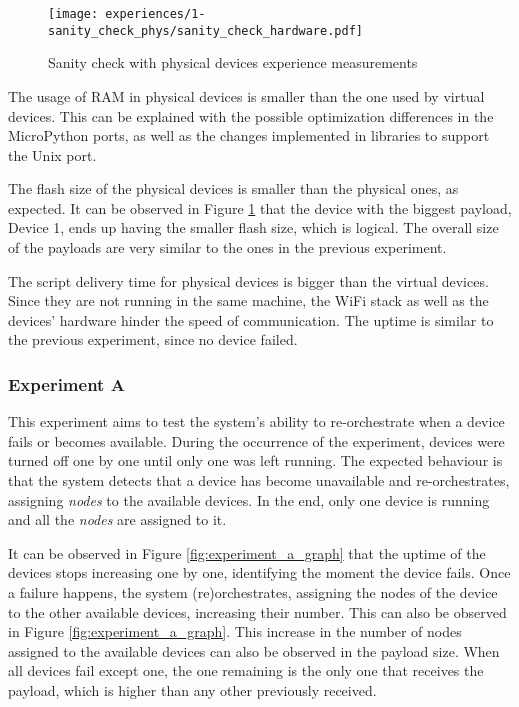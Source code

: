 \begin{figure}[h]
\centering
\texttt{[image: experiences/1-sanity\_check\_phys/sanity\_check\_hardware.pdf]}
\caption[Sanity check with physical devices experience measurements]{Sanity check with physical devices experience measurements}\label{fig:sanity_check_phys_graph}
\end{figure}

The usage of RAM in physical devices is smaller than the one used by virtual devices. This can be explained with the possible optimization differences in the MicroPython ports, as well as the changes implemented in libraries to support the Unix port.

The flash size of the physical devices is smaller than the physical ones, as expected. It can be observed in Figure \ref{fig:sanity_check_phys_graph} that the device with the biggest payload, Device 1, ends up having the smaller flash size, which is logical. The overall size of the payloads are very similar to the ones in the previous experiment. 

The script delivery time for physical devices is bigger than the virtual devices. Since they are not running in the same machine, the WiFi stack as well as the devices' hardware hinder the speed of communication. The uptime is similar to the previous experiment, since no device failed.


\subsubsection{Experiment A}\label{sec:exp_a}

This experiment aims to test the system's ability to re-orchestrate when a device fails or becomes available. During the occurrence of the experiment, devices were turned off one by one until only one was left running. The expected behaviour is that the system detects that a device has become unavailable and re-orchestrates, assigning \textit{nodes} to the available devices. In the end, only one device is running and all the \textit{nodes} are assigned to it.

It can be observed in Figure \ref{fig:experiment_a_graph} that the uptime of the devices stops increasing one by one, identifying the moment the device fails. Once a failure happens, the system (re)orchestrates, assigning the nodes of the device to the other available devices, increasing their number. This can also be observed in Figure \ref{fig:experiment_a_graph}. This increase in the number of nodes assigned to the available devices can also be observed in the payload size. When all devices fail except one, the one remaining is the only one that receives the payload, which is higher than any other previously received.

